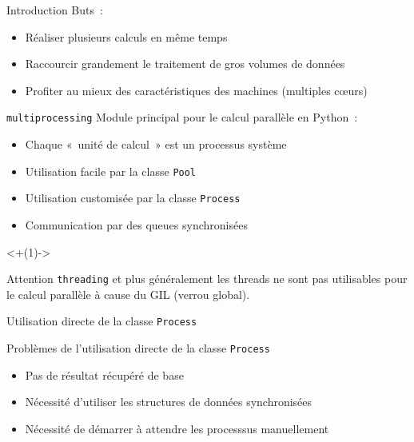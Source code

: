 \begin{frame}{Introduction}
  Buts~:
  \begin{itemize}[<+(1)->]
    \item Réaliser plusieurs calculs en même temps
    \item Raccourcir grandement le traitement de gros volumes de données
    \item Profiter au mieux des caractéristiques des machines (multiples cœurs)
  \end{itemize}
\end{frame}

\begin{frame}{\texttt{multiprocessing}}
  Module principal pour le calcul parallèle en Python~:

  \begin{itemize}[<+(1)->]
    \item Chaque «~unité de calcul~» est un processus système
    \item Utilisation facile par la classe \texttt{Pool}
    \item Utilisation customisée par la classe \texttt{Process}
    \item Communication par des queues synchronisées
  \end{itemize}

  \onslide<+(1)->{
    \begin{alertblock}{Attention}
      \texttt{threading} et plus généralement les threads ne sont pas utilisables pour le calcul parallèle à cause du GIL (verrou global).
    \end{alertblock}
  }
\end{frame}

\begin{frame}{Utilisation directe de la classe \texttt{Process}}


\end{frame}

\begin{frame}{Problèmes de l'utilisation directe de la classe \texttt{Process}}

  \begin{itemize}[<+->]
    \item Pas de résultat récupéré de base
    \item Nécessité d'utiliser les structures de données synchronisées
    \item Nécessité de démarrer à attendre les processsus manuellement
  \end{itemize}

\end{frame}

